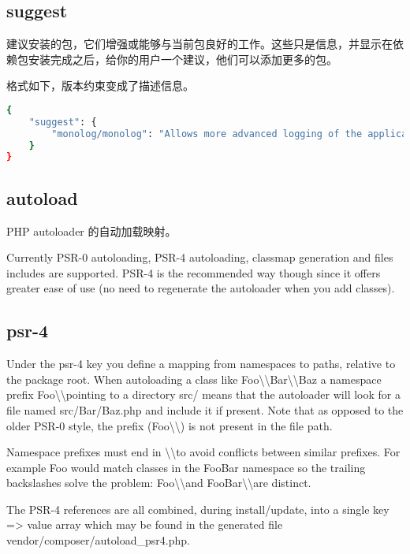 \subsection{suggest}

建议安装的包，它们增强或能够与当前包良好的工作。这些只是信息，并显示在依赖包安装完成之后，给你的用户一个建议，他们可以添加更多的包。

格式如下，版本约束变成了描述信息。



\begin{lstlisting}[language=bash]
{
    "suggest": {
        "monolog/monolog": "Allows more advanced logging of the application flow"
    }
}
\end{lstlisting}

\subsection{autoload}

PHP autoloader 的自动加载映射。

Currently PSR-0 autoloading, PSR-4 autoloading, classmap generation and files includes are supported. PSR-4 is the recommended way though since it offers greater ease of use (no need to regenerate the autoloader when you add classes).

\subsection{psr-4}

Under the psr-4 key you define a mapping from namespaces to paths, relative to the package root. When autoloading a class like Foo\textbackslash \textbackslash Bar\textbackslash \textbackslash Baz a namespace prefix Foo\textbackslash \textbackslash  pointing to a directory src/ means that the autoloader will look for a file named src/Bar/Baz.php and include it if present. Note that as opposed to the older PSR-0 style, the prefix (Foo\textbackslash \textbackslash ) is not present in the file path.

Namespace prefixes must end in \textbackslash \textbackslash  to avoid conflicts between similar prefixes. For example Foo would match classes in the FooBar namespace so the trailing backslashes solve the problem: Foo\textbackslash \textbackslash  and FooBar\textbackslash \textbackslash  are distinct.

The PSR-4 references are all combined, during install/update, into a single key => value array which may be found in the generated file vendor/composer/autoload\_psr4.php.



